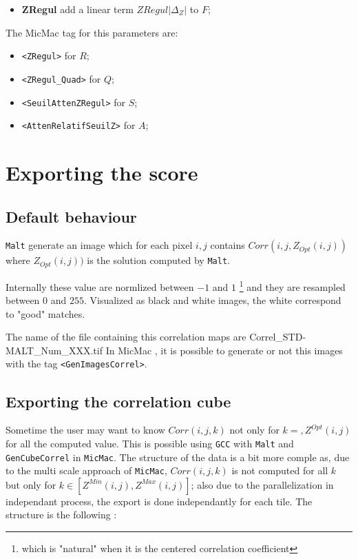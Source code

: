 \begin{itemize}
   \item {\bf ZRegul} add a linear term $ZRegul |\Delta_Z| $ to $F$;
\end{itemize}


The MicMac tag for this parameters are:

\begin{itemize}
   \item {\tt <ZRegul>}  for $R$;
   \item {\tt <ZRegul\_Quad>}  for $Q$;
   \item {\tt <SeuilAttenZRegul>}  for $S$;
   \item {\tt <AttenRelatifSeuilZ>}  for $A$;
\end{itemize}




\section{Exporting the score}

\subsection{Default behaviour}

{\tt Malt}  generate an image which for each pixel
$i,j$ contains   $Corr(i,j,Z_{Opt}(i,j))$  where $Z_{Opt}(i,j))$
is the solution computed by {\tt Malt}.

Internally these value are normlized between $-1$ and $1$ 
\footnote{which is "natural" when it is the centered correlation coefficient}
and they  are resampled between $0$ and $255$. Visualized as black and white
images, the white correspond to "good" matches.

The name of the file containing this correlation maps are Correl\_STD-MALT\_Num\_XXX.tif
In MicMac , it is possible to generate or not this images with the tag {\tt <GenImagesCorrel>}.

\subsection{Exporting the correlation cube}

Sometime the user may  want to know $Corr(i,j,k)$ not only for $k=,Z^{Opt}(i,j)$ for all 
the computed value. This is possible using {\tt GCC} with {\tt Malt} and {\tt GenCubeCorrel}
in {\tt MicMac}. The structure of the data is a bit more comple as, due to the multi
scale approach of {\tt MicMac}, $Corr(i,j,k)$ is not computed  for  all $k$ but only
for $k \in [Z^{Min}(i,j),Z^{Max}(i,j)]$; also due to the parallelization in independant
process, the export is done independantly for each tile. The structure is the following :

